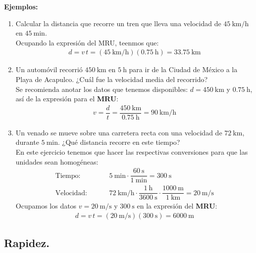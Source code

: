 \documentclass[14pt]{extarticle}
\begin{document}
\noindent
\textbf{Ejemplos: }
\begin{enumerate}[label=\roman*)]
\item  Calcular la distancia que recorre un tren que lleva una velocidad de $\SI{45}{\kilo\meter\per\hour}$ en $\SI{45}{\minute}$.
\\[0.5em]
\noindent
Ocupando la expresión del MRU, teenmos que:
\begin{align*}
d = v \, t = (\SI{45}{\kilo\meter\per\hour})(\SI{0.75}{\hour}) = \SI{33.75}{\kilo\meter}
\end{align*}
\item Un automóvil recorrió $\SI{450}{\kilo\meter}$ en $\SI{5}{\hour}$ para ir de la Ciudad de México a la Playa de Acapulco. ¿Cuál fue la velocidad media del recorrido?
\\[0.5em]
Se recomienda anotar los datos que tenemos disponibles: $d = \SI{450}{\kilo\meter}$ y $\SI{0.75}{\hour}$, así de la expresión para el \textbf{MRU}:
\begin{align*}
v = \dfrac{d}{t} = \dfrac{\SI{450}{\kilo\meter}}{\SI{0.75}{\hour}} = \SI{90}{\kilo\meter\per\hour}
\end{align*}
\item Un venado se mueve sobre una carretera recta con una velocidad de $\SI{72}{\kilo\meter}$, durante $\SI{5}{\minute}$. ¿Qué distancia recorre en este tiempo?
\\[0.5em]
En este ejercicio tenemos que hacer las respectivas conversiones para que las unidades sean homogéneas:
\begin{align*}
\text{Tiempo:} \hspace{1cm} &\SI{5}{\minute} \cdot \dfrac{\SI{60}{\second}}{\SI{1}{\minute}} = \SI{300}{\second} \\[0.5em]
\text{Velocidad:} \hspace{1cm} &\SI{72}{\kilo\meter\per\hour} \cdot \dfrac{\SI{1}{\hour}}{\SI{3600}{\second}} \cdot \dfrac{\SI{1000}{\meter}}{\SI{1}{\kilo\meter}} = \SI{20}{\meter\per\second}
\end{align*}
Ocupamos los datos $v = \SI{20}{\meter\per\second}$ y $\SI{300}{\second}$ en la expresión del \textbf{MRU}:
\begin{align*}
d = v \, t = (\SI{20}{\meter\per\second})(\SI{300}{\second}) = \SI{6000}{\meter}
\end{align*}

\end{enumerate}


\subsection{Rapidez.}
\end{document}
